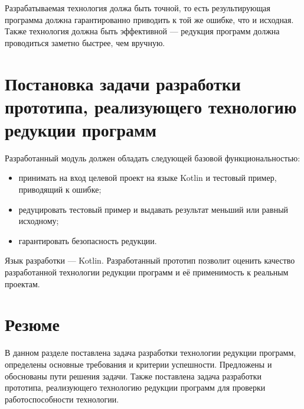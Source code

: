 Разрабатываемая технология должа быть точной, то есть результирующая программа должна гарантированно приводить к той же ошибке, что и исходная. Также технология должна быть эффективной --- редукция программ должна проводиться заметно быстрее, чем вручную. 


\section{Постановка задачи разработки прототипа, реализующего технологию редукции программ}
Разработанный модуль должен обладать следующей базовой функциональностью:
\begin{itemize}
\item принимать на вход целевой проект на языке Kotlin и тестовый пример, приводящий к ошибке;
\item редуцировать тестовый пример и выдавать результат меньший или равный исходному;
\item гарантировать безопасность редукции.
\end{itemize}
Язык разработки --- Kotlin. Разработанный прототип позволит оценить качество разработанной технологии редукции программ и её применимость к реальным проектам.

\section{Резюме}
В данном разделе поставлена задача разработки технологии редукции программ, определены основные требования и критерии успешности. Предложены и обоснованы пути решения задачи. Также поставлена задача разработки прототипа, реализующего технологию редукции программ для проверки работоспособности технологии.